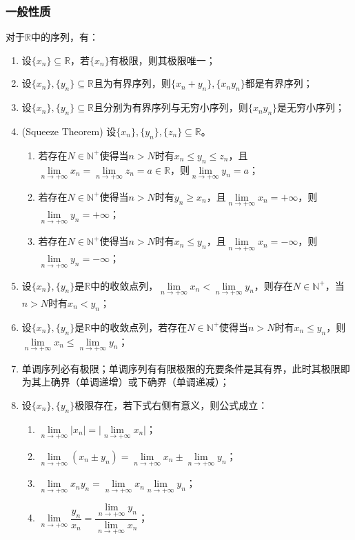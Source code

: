 \subsubsection{一般性质}
\begin{property}\label{prop:RSeq}
	对于$\mathbb{R}$中的序列，有：
	\begin{enumerate}
		\item 设$\{x_n\}\subseteq\mathbb{R}$，若$\{x_n\}$有极限，则其极限唯一；
		\item 设$\{x_n\},\{y_n\}\subseteq \mathbb{R}$且为有界序列，则$\{x_n+y_n\},\{x_ny_n\}$都是有界序列；
		\item 设$\{x_n\},\{y_n\}\subseteq\mathbb{R}$且分别为有界序列与无穷小序列，则$\{x_ny_n\}$是无穷小序列；
		\item (Squeeze Theorem) 设$\{x_n\},\{y_n\},\{z_n\}\subseteq\mathbb{R}$。
		\begin{enumerate}
			\item 若存在$N\in\mathbb{N}^+$使得当$n>N$时有$x_n\leqslant y_n\leqslant z_n$，且$\lim\limits_{n\to+\infty}x_n=\lim\limits_{n\to+\infty}z_n=a\in\mathbb{R}$，则$\lim\limits_{n\to+\infty}y_n=a$；
			\item 若存在$N\in\mathbb{N}^+$使得当$n>N$时有$y_n\geqslant x_n$，且$\lim\limits_{n\to+\infty}x_n=+\infty$，则$\lim\limits_{n\to+\infty}y_n=+\infty$；
			\item 若存在$N\in\mathbb{N}^+$使得当$n>N$时有$x_n\leqslant y_n$，且$\lim\limits_{n\to+\infty}x_n=-\infty$，则$\lim\limits_{n\to+\infty}y_n=-\infty$；
		\end{enumerate}
		\item 设$\{x_n\},\{y_n\}$是$\mathbb{R}$中的收敛点列，$\lim\limits_{n\to+\infty}x_n<\lim\limits_{n\to+\infty}y_n$，则存在$N\in\mathbb{N}^+$，当$n>N$时有$x_n<y_n$；
		\item 设$\{x_n\},\{y_n\}$是$\mathbb{R}$中的收敛点列，若存在$N\in\mathbb{N}^+$使得当$n>N$时有$x_n\leqslant y_n$，则$\lim\limits_{n\to+\infty}x_n\leqslant\lim\limits_{n\to+\infty}y_n$；
		\item 单调序列必有极限；单调序列有有限极限的充要条件是其有界，此时其极限即为其上确界（单调递增）或下确界（单调递减）；
		\item 设$\{x_n\},\{y_n\}$极限存在，若下式右侧有意义，则公式成立：
		\begin{enumerate}
			\item $\lim\limits_{n\to+\infty}|x_n|=\Big|\lim\limits_{n\to+\infty}x_n\Big|$；
			\item $\lim\limits_{n\to+\infty}(x_n\pm y_n)=\lim\limits_{n\to+\infty}x_n\pm \lim\limits_{n\to+\infty}y_n$；
			\item $\lim\limits_{n\to+\infty}x_ny_n=\lim\limits_{n\to+\infty}x_n\lim\limits_{n\to+\infty}y_n$；
			\item $\lim\limits_{n\to+\infty}\dfrac{y_n}{x_n}=\dfrac{\lim\limits_{n\to+\infty}y_n}{\lim\limits_{n\to+\infty}x_n}$；
		\end{enumerate}
	\end{enumerate}
\end{property}
